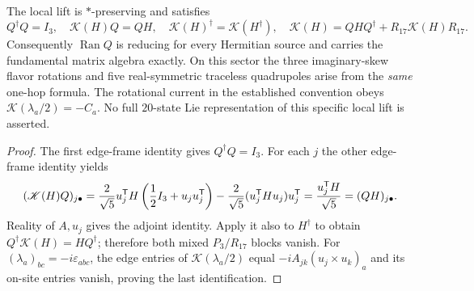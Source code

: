 \documentclass[11pt]{article}
\begin{document}
\begin{theorem}
\label{p1b:thm:fullcarrier-protected-local-flavor}
The local lift is $*$-preserving and satisfies
\[
 \boxed{Q^\dagger Q=I_3,\quad
 \mathscr K(H)Q=QH,\quad
 \mathscr K(H)^\dagger=\mathscr K(H^\dagger),\quad
 \mathscr K(H)=QHQ^\dagger+R_{17}\mathscr K(H)R_{17}.}
\]
Consequently $\operatorname{Ran}Q$ is reducing for every Hermitian
source and carries the fundamental matrix algebra exactly.  On this
sector the three imaginary-skew flavor rotations and five real-symmetric
traceless quadrupoles arise from the \emph{same} one-hop formula.  The
rotational current in the established convention obeys
$\mathscr K(\lambda_a/2)=-C_a$.  No full $20$-state Lie representation
of this specific local lift is asserted.
\end{theorem}
\begin{proof}
The first edge-frame identity gives $Q^\dagger Q=I_3$.
For each $j$ the other edge-frame identity yields
\[
 (\mathscr K(H)Q)_{j\bullet}={2\over\sqrt5}
 u_j^{\mathsf T}H\left({1\over2}I_3+u_ju_j^{\mathsf T}\right)
 -{2\over\sqrt5}(u_j^{\mathsf T}Hu_j)u_j^{\mathsf T}
 ={u_j^{\mathsf T}H\over\sqrt5}=(QH)_{j\bullet}.
\]
Reality of $A,u_j$ gives the adjoint identity.  Apply it also to
$H^\dagger$ to obtain $Q^\dagger\mathscr K(H)=HQ^\dagger$;
therefore both mixed $P_3/R_{17}$ blocks vanish.  For
$(\lambda_a)_{bc}=-i\varepsilon_{abc}$, the edge entries of
$\mathscr K(\lambda_a/2)$ equal $-iA_{jk}(u_j\times u_k)_a$
and its on-site entries vanish, proving the last identification.
\end{proof}
\end{document}
